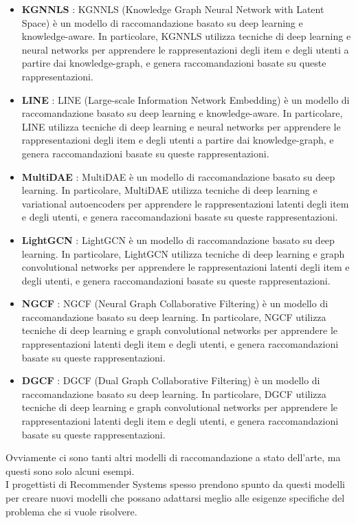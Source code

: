 \begin{itemize}
    \item \textbf{KGNNLS} \cite{KGNNLS}: KGNNLS (Knowledge Graph Neural Network with Latent Space) è un modello di raccomandazione basato su deep learning e knowledge-aware. In particolare, KGNNLS utilizza tecniche di deep learning e neural networks per apprendere le rappresentazioni degli item e degli utenti a partire dai knowledge-graph, e genera raccomandazioni basate su queste rappresentazioni.
    \item \textbf{LINE} \cite{LINE}: LINE (Large-scale Information Network Embedding) è un modello di raccomandazione basato su deep learning e knowledge-aware. In particolare, LINE utilizza tecniche di deep learning e neural networks per apprendere le rappresentazioni degli item e degli utenti a partire dai knowledge-graph, e genera raccomandazioni basate su queste rappresentazioni.
    \item \textbf{MultiDAE} \cite{MultiDAE}: MultiDAE è un modello di raccomandazione basato su deep learning. In particolare, MultiDAE utilizza tecniche di deep learning e variational autoencoders per apprendere le rappresentazioni latenti degli item e degli utenti, e genera raccomandazioni basate su queste rappresentazioni.
    \item \textbf{LightGCN} \cite{LightGCN}: LightGCN è un modello di raccomandazione basato su deep learning. In particolare, LightGCN utilizza tecniche di deep learning e graph convolutional networks per apprendere le rappresentazioni latenti degli item e degli utenti, e genera raccomandazioni basate su queste rappresentazioni.
    \item \textbf{NGCF} \cite{NGCF}: NGCF (Neural Graph Collaborative Filtering) è un modello di raccomandazione basato su deep learning. In particolare, NGCF utilizza tecniche di deep learning e graph convolutional networks per apprendere le rappresentazioni latenti degli item e degli utenti, e genera raccomandazioni basate su queste rappresentazioni.
    \item \textbf{DGCF} \cite{DGCF}: DGCF (Dual Graph Collaborative Filtering) è un modello di raccomandazione basato su deep learning. In particolare, DGCF utilizza tecniche di deep learning e graph convolutional networks per apprendere le rappresentazioni latenti degli item e degli utenti, e genera raccomandazioni basate su queste rappresentazioni.
\end{itemize}


\noindent Ovviamente ci sono tanti altri modelli di raccomandazione a stato dell'arte, ma questi sono solo alcuni esempi.\\
I progettisti di Recommender Systems spesso prendono spunto da questi modelli per creare nuovi modelli che possano adattarsi meglio alle esigenze specifiche del problema che si vuole risolvere.\\



